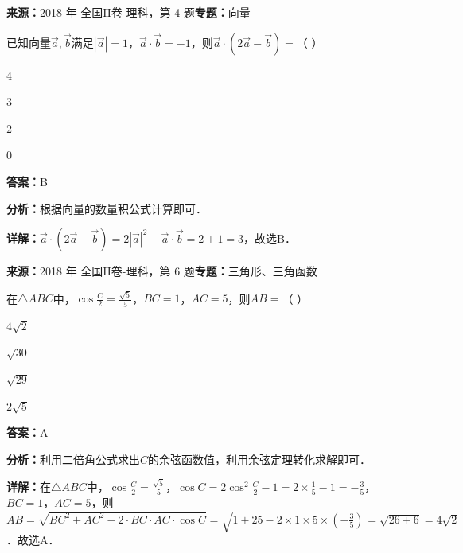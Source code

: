 \begin{question}[points=5]
\textbf{来源：}2018 年 全国II卷-理科，第 4 题\quad \textbf{专题：}向量\par
已知向量$\vec{a},\vec{b}$满足$|\vec{a}|=1$，$\vec{a}\cdot\vec{b}=-1$，则$\vec{a}\cdot(2\vec{a}-\vec{b})=$（     ）
\begin{choices}
  \item $4$
  \item $3$
  \item $2$
  \item $0$
\end{choices}
\begin{solution}
\textbf{答案：}B

\textbf{分析：}根据向量的数量积公式计算即可．

\textbf{详解：}$\vec{a}\cdot(2\vec{a}-\vec{b})=2|\vec{a}|^2-\vec{a}\cdot\vec{b}=2+1=3$，故选B．
\end{solution}
\end{question}

\begin{question}[points=5]
\textbf{来源：}2018 年 全国II卷-理科，第 6 题\quad \textbf{专题：}三角形、三角函数\par
在$\triangle ABC$中，$\cos\frac{C}{2}=\frac{\sqrt{5}}{5}$，$BC=1$，$AC=5$，则$AB=$（    ）
\begin{choices}
  \item $4\sqrt{2}$
  \item $\sqrt{30}$
  \item $\sqrt{29}$
  \item $2\sqrt{5}$
\end{choices}
\begin{solution}
\textbf{答案：}A

\textbf{分析：}利用二倍角公式求出$C$的余弦函数值，利用余弦定理转化求解即可．

\textbf{详解：}在$\triangle ABC$中，$\cos\frac{C}{2}=\frac{\sqrt{5}}{5}$，$\cos C=2\cos^2\frac{C}{2}-1=2\times\frac{1}{5}-1=-\frac{3}{5}$，$BC=1$，$AC=5$，则$AB=\sqrt{BC^2+AC^2-2\cdot BC\cdot AC\cdot\cos C}=\sqrt{1+25-2\times1\times5\times(-\frac{3}{5})}=\sqrt{26+6}=4\sqrt{2}$．故选A．
\end{solution}
\end{question}


